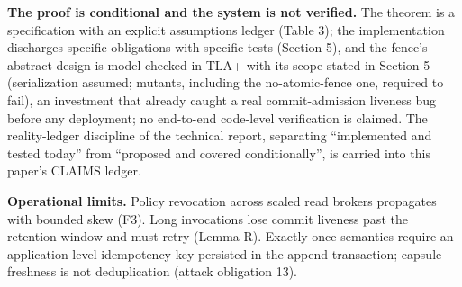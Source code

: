 \documentclass[
  11pt,
]{article}
\begin{document}
\textbf{The proof is conditional and the system is not verified.} The theorem is a specification with an explicit assumptions ledger (Table 3); the implementation discharges specific obligations with specific tests (Section 5), and the fence's abstract design is model-checked in TLA+ with its scope stated in Section 5 (serialization assumed; mutants, including the no-atomic-fence one, required to fail), an investment that already caught a real commit-admission liveness bug before any deployment; no end-to-end code-level verification is claimed. The reality-ledger discipline of the technical report, separating ``implemented and tested today'' from ``proposed and covered conditionally'', is carried into this paper's CLAIMS ledger.

\textbf{Operational limits.} Policy revocation across scaled read brokers propagates with bounded skew (F3). Long invocations lose commit liveness past the retention window and must retry (Lemma R). Exactly-once semantics require an application-level idempotency key persisted in the append transaction; capsule freshness is not deduplication (attack obligation 13).
\end{document}
